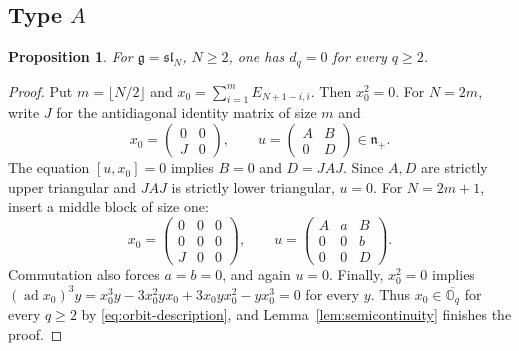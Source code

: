 \documentclass[11pt]{amsart}
\newtheorem{proposition}[theorem]{Proposition}
\theoremstyle{definition}
\theoremstyle{remark}
\newcommand{\g}{\mathfrak g}
\newcommand{\n}{\mathfrak n_+}
\newcommand{\J}{J_\infty}
\newcommand{\slalg}{\mathfrak{sl}}
\DeclareMathOperator{\ad}{ad}
\begin{document}
\subsection{Type \texorpdfstring{$A$}{A}}
\begin{proposition}\label{prop:typeA}
For $\g=\slalg_N$, $N\ge2$, one has $d_q=0$ for every $q\ge2$.
\end{proposition}
\begin{proof}
Put $m=\lfloor N/2\rfloor$ and
$x_0=\sum_{i=1}^m E_{N+1-i,i}$. Then $x_0^2=0$. For $N=2m$,
write $J$ for the antidiagonal identity matrix of size $m$ and
\[
 x_0=\begin{pmatrix}0&0\\J&0\end{pmatrix},\qquad
 u=\begin{pmatrix}A&B\\0&D\end{pmatrix}\in\n.
\]
The equation $[u,x_0]=0$ implies $B=0$ and $D=JAJ$.
Since $A,D$ are strictly upper triangular and $JAJ$ is strictly
lower triangular, $u=0$. For $N=2m+1$, insert a middle block of size
one:
\[
 x_0=\begin{pmatrix}0&0&0\\0&0&0\\J&0&0\end{pmatrix},\qquad
 u=\begin{pmatrix}A&a&B\\0&0&b\\0&0&D\end{pmatrix}.
\]
Commutation also forces $a=b=0$, and again $u=0$.
Finally, $x_0^2=0$ implies $(\ad x_0)^3y=x_0^3 y-3x_0^2 y x_0+3x_0 y x_0^2-y x_0^3 =0$ for every $y$.
Thus $x_0\in\overline{\mathbb O_q}$ for every $q\ge2$ by
\eqref{eq:orbit-description}, and Lemma~\ref{lem:semicontinuity}
finishes the proof.
\end{proof}
\end{document}
